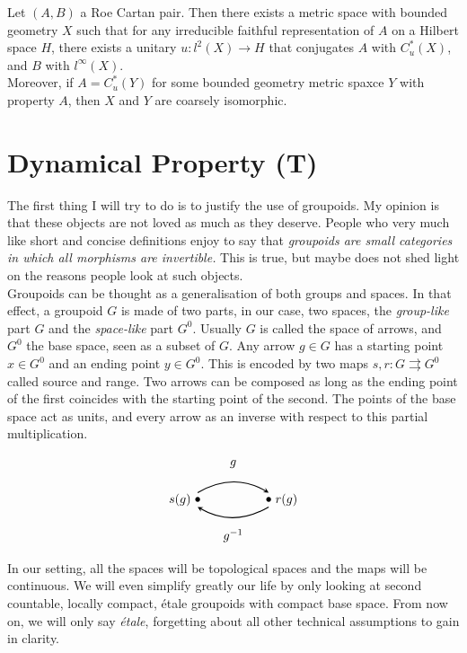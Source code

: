 \begin{thm}
Let $(A,B)$ a Roe Cartan pair. Then there exists a metric space with bounded geometry $X$ such that for any irreducible faithful representation of $A$ on a Hilbert space $H$, there exists a unitary $u : l^2(X) \rightarrow H$ that conjugates $A$ with $C^*_u(X)$, and $B$ with $l^\infty(X)$. \\
Moreover, if $A= C^*_u(Y)$ for some bounded geometry metric spaxce $Y$ with property $A$, then $X$ and $Y$ are coarsely isomorphic.
\end{thm}
\section{Dynamical Property (T)}

The first thing I will try to do is to justify the use of groupoids. My opinion is that these objects are not loved as much as they deserve. People who very much like short and concise definitions enjoy to say that \textit{groupoids are small categories in which all morphisms are invertible.} This is true, but maybe does not shed light on the reasons people look at such objects. \\

Groupoids can be thought as a generalisation of both groups and spaces. In that effect, a groupoid $G$ is made of two parts, in our case, two spaces, the \textit{group-like} part $G$ and the \textit{space-like} part $G^0$. Usually $G$ is called the space of arrows, and $G^0$ the base space, seen as a subset of $G$. Any arrow $g\in G$ has a starting point $x\in G^0$ and an ending point $y\in G^0$. This is encoded by two maps $s,r : G \rightrightarrows G^0$ called source and range. Two arrows can be composed as long as the ending point of the first coincides with the starting point of the second. The points of the base space act as units, and every arrow as an inverse with respect to this partial multiplication.

\[\begin{tikzpicture}
\draw  (0,1) node {$g$};
\draw  (0,-1) node {$g^{-1}$};
\draw [>=stealth, ->, thick] (-1,0.2) to[bend left] (1,0.2);
\draw [>=stealth, ->,thick] (1,-0.2) to[bend left] (-1,-0.2);
\draw  (-1,0) node {$\bullet$};
\draw  (-1.5,0) node {$s(g)$};
\draw  (1,0) node {$\bullet$};
\draw  (1.5,0) node {$r(g)$};
\end{tikzpicture}\]

In our setting, all the spaces will be topological spaces and the maps will be continuous. We will even simplify greatly our life by only looking at second countable, locally compact, étale groupoids with compact base space. From now on, we will only say \textit{étale}, forgetting about all other technical assumptions to gain in clarity.\\ 

